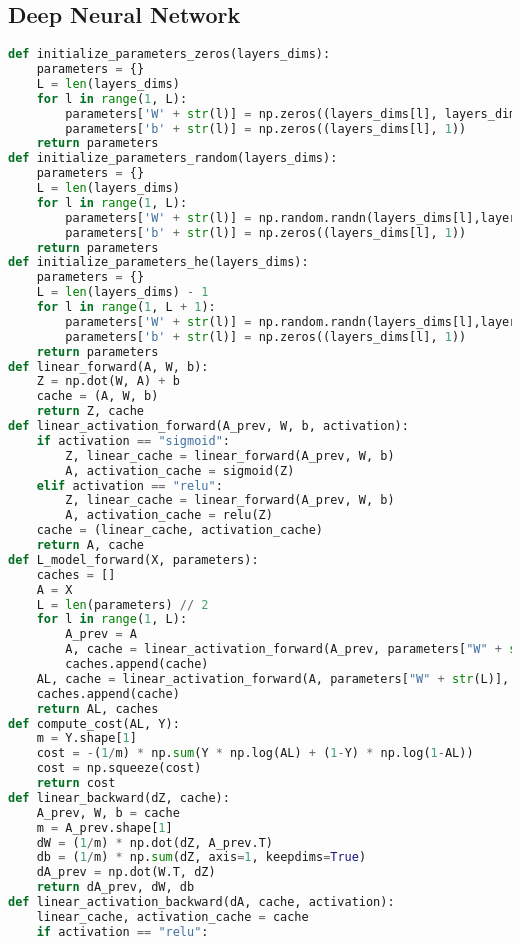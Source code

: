 \subsection{Deep Neural Network}

\begin{lstlisting}[language=Python]
def initialize_parameters_zeros(layers_dims):
    parameters = {}
    L = len(layers_dims)
    for l in range(1, L):
        parameters['W' + str(l)] = np.zeros((layers_dims[l], layers_dims[l-1]))
        parameters['b' + str(l)] = np.zeros((layers_dims[l], 1))
    return parameters
def initialize_parameters_random(layers_dims):
    parameters = {}
    L = len(layers_dims) 
    for l in range(1, L):
        parameters['W' + str(l)] = np.random.randn(layers_dims[l],layers_dims[l-1]) * 10
        parameters['b' + str(l)] = np.zeros((layers_dims[l], 1))
    return parameters
def initialize_parameters_he(layers_dims):
    parameters = {}
    L = len(layers_dims) - 1
    for l in range(1, L + 1):
        parameters['W' + str(l)] = np.random.randn(layers_dims[l],layers_dims[l-1]) * np.sqrt(2/layers_dims[l-1])
        parameters['b' + str(l)] = np.zeros((layers_dims[l], 1))
    return parameters
def linear_forward(A, W, b):
    Z = np.dot(W, A) + b
    cache = (A, W, b)
    return Z, cache
def linear_activation_forward(A_prev, W, b, activation):
    if activation == "sigmoid":
        Z, linear_cache = linear_forward(A_prev, W, b)
        A, activation_cache = sigmoid(Z)
    elif activation == "relu":
        Z, linear_cache = linear_forward(A_prev, W, b)
        A, activation_cache = relu(Z)
    cache = (linear_cache, activation_cache)
    return A, cache
def L_model_forward(X, parameters):
    caches = []
    A = X
    L = len(parameters) // 2
    for l in range(1, L):
        A_prev = A 
        A, cache = linear_activation_forward(A_prev, parameters["W" + str(l)], parameters["b" + str(l)], "relu")
        caches.append(cache)
    AL, cache = linear_activation_forward(A, parameters["W" + str(L)], parameters["b" + str(L)], "sigmoid")
    caches.append(cache)
    return AL, caches
def compute_cost(AL, Y):
    m = Y.shape[1]
    cost = -(1/m) * np.sum(Y * np.log(AL) + (1-Y) * np.log(1-AL))
    cost = np.squeeze(cost)
    return cost
def linear_backward(dZ, cache):
    A_prev, W, b = cache
    m = A_prev.shape[1]
    dW = (1/m) * np.dot(dZ, A_prev.T)
    db = (1/m) * np.sum(dZ, axis=1, keepdims=True)
    dA_prev = np.dot(W.T, dZ)
    return dA_prev, dW, db
def linear_activation_backward(dA, cache, activation):
    linear_cache, activation_cache = cache
    if activation == "relu":

\end{lstlisting}
